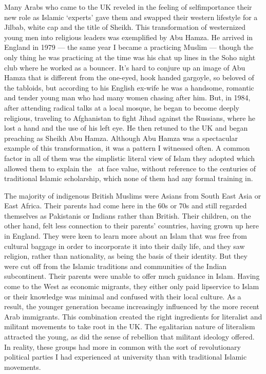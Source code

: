 \documentclass[12pt]{memoir}
\begin{document}
Many Arabs who came to the UK reveled in the feeling of self\–importance
their new role as Islamic ‘experts’ gave them
and swapped their western lifestyle for a Jilbab,
white cap and the title of Sheikh.
This transformation of westernized young men
into religious leaders was exemplified by Abu Hamza.
He arrived in England in 1979 — the same year I became a practicing Muslim —
though the only thing he was practicing at the time
was his chat up lines in the Soho night club where he worked as a bouncer.
It’s hard to conjure up an image of Abu Hamza
that is different from the one-eyed,
hook handed gargoyle, so beloved of the tabloids,
but according to his English ex-wife he was a handsome,
romantic and tender young man who had many women chasing after him.
But, in 1984, after attending radical talks at a local mosque,
he began to become deeply religious,
traveling to Afghanistan to fight Jihad against the Russians,
where he lost a hand and the use of his left eye.
He then retuned to the UK and began preaching as Sheikh Abu Hamza.
Although Abu Hamza was a spectacular example of this transformation,
it was a pattern I witnessed often.
A common factor in all of them was the simplistic literal view of Islam
they adopted which allowed them to explain the \Quran\ at face value,
without reference to the centuries of traditional Islamic scholarship,
which none of them had any formal training in.

The majority of indigenous British Muslims were Asians
from South East Asia or East Africa.
Their parents had come here in the 60s or 70s
and still regarded themselves as Pakistanis or Indians rather than British.
Their children, on the other hand,
felt less connection to their parents’ countries,
having grown up here in England.
They were keen to learn more about an Islam
that was free from cultural baggage
in order to incorporate it into their daily life,
and they saw religion, rather than nationality,
as being the basis of their identity.
But they were cut off from the Islamic traditions
and communities of the Indian sub\–continent.
Their parents were unable to offer much guidance in Islam.
Having come to the West as economic migrants,
they either only paid lip\–service to Islam
or their knowledge was minimal and confused with their local culture.
As a result, the younger generation became increasingly influenced
by the more recent Arab immigrants.
This combination created the right ingredients for literalist
and militant movements to take root in the UK.
The egalitarian nature of literalism attracted the young,
as did the sense of rebellion that militant ideology offered.
In reality, these groups had more in common
with the sort of revolutionary political parties
I had experienced at university than with traditional Islamic movements.
\end{document}
